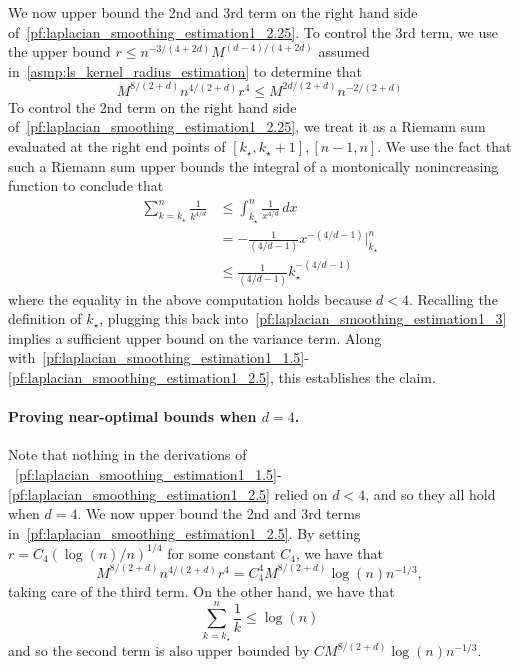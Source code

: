 \documentclass[twoside]{article}
\newcommand{\1}{\mathbf{1}}
\theoremstyle{definition}
\theoremstyle{remark}
\begin{document}
We now upper bound the 2nd and 3rd term on the right hand side of~\eqref{pf:laplacian_smoothing_estimation1_2.25}. To control the 3rd term, we use the upper bound $r \leq n^{-3/(4 + 2d)} M^{(d - 4)/(4 + 2d)}$ assumed in~\ref{asmp:ls_kernel_radius_estimation} to determine that
\begin{equation}
\label{pf:laplacian_smoothing_estimation1_3}
M^{8/(2 + d)}n^{4/(2 + d)}r^4 \leq M^{2d/(2 + d)}n^{-2/(2 + d)} 
\end{equation}
To control the 2nd term on the right hand side of~\eqref{pf:laplacian_smoothing_estimation1_2.25}, we treat it as a Riemann sum evaluated at the right end points of $[k_{\star},k_{\star} + 1], [n - 1,n]$. We use the fact that such a Riemann sum upper bounds the integral of a montonically nonincreasing function to conclude that
\begin{equation}
\label{pf:laplacian_smoothing_estimation1_4}
\begin{aligned}
\sum_{k = k_{\star}}^{n} \frac{1}{k^{4/d}} & \leq \int_{k_{\star}}^{n} \frac{1}{x^{4/d}} \,dx \\
& = - \frac{1}{(4/d - 1)} x^{-(4/d - 1)} \Big|_{k_{\star}}^{n} \\
& \leq \frac{1}{(4/d - 1)} k_{\star}^{-(4/d - 1)}
\end{aligned}
\end{equation}
where the equality in the above computation holds because $d < 4$. Recalling the definition of $k_{\star}$, plugging this back into~\eqref{pf:laplacian_smoothing_estimation1_3} implies a sufficient upper bound on the variance term. Along with~\eqref{pf:laplacian_smoothing_estimation1_1.5}-\eqref{pf:laplacian_smoothing_estimation1_2.5}, this establishes the claim.

\paragraph{Proving near-optimal bounds when $d = 4$.}
Note that nothing in the derivations of  ~\eqref{pf:laplacian_smoothing_estimation1_1.5}-\eqref{pf:laplacian_smoothing_estimation1_2.5} relied on $d < 4$, and so they all hold when $d = 4$. We now upper bound the 2nd and 3rd terms in~\eqref{pf:laplacian_smoothing_estimation1_2.5}. By setting $r = C_4(\log(n)/n)^{1/4}$ for some constant $C_4$, we have that
\begin{equation*}
M^{8/(2+d)}n^{4/(2+d)}r^4 = C_4^4 M^{8/(2+d)} \log(n) n^{-1/3},
\end{equation*}
taking care of the third term. On the other hand, we have that
\begin{equation*}
\sum_{k = k_{\star}}^{n} \frac{1}{k} \leq \log(n)
\end{equation*}
and so the second term is also upper bounded by $C M^{8/(2+d)} \log(n) n^{-1/3}$.
\end{document}
